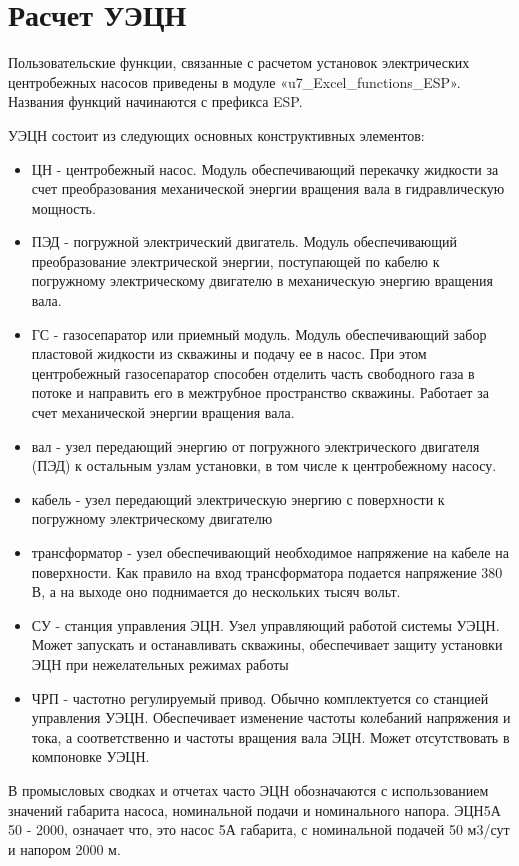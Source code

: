 \section{Расчет УЭЦН}
Пользовательские функции, связанные с расчетом установок электрических центробежных насосов приведены в модуле «u7\_Excel\_functions\_ESP».  Названия функций начинаются с префикса ESP. 

УЭЦН состоит из следующих основных конструктивных элементов:
\begin{itemize}
	\item ЦН - центробежный насос. Модуль обеспечивающий перекачку жидкости за счет преобразования механической энергии вращения вала в гидравлическую мощность. 
	\item ПЭД - погружной электрический двигатель. Модуль обеспечивающий преобразование электрической энергии, поступающей по кабелю к погружному электрическому двигателю в механическую энергию вращения вала.
	\item ГС - газосепаратор или приемный модуль. Модуль обеспечивающий забор пластовой жидкости из скважины и подачу ее в насос. При этом центробежный газосепаратор способен отделить часть свободного газа в потоке и направить его в межтрубное пространство скважины. Работает за счет механической энергии вращения вала.
	\item вал - узел передающий энергию от погружного электрического двигателя (ПЭД) к остальным узлам установки, в том числе к центробежному насосу.
	\item кабель - узел передающий электрическую энергию с поверхности к погружному электрическому двигателю
	\item трансформатор - узел обеспечивающий необходимое напряжение на кабеле на поверхности. Как правило на вход трансформатора подается напряжение 380 В, а на выходе оно поднимается до нескольких тысяч вольт. 
	\item СУ - станция управления ЭЦН. Узел управляющий работой системы УЭЦН. Может запускать и  останавливать скважины, обеспечивает защиту установки ЭЦН при нежелательных режимах работы
	\item ЧРП - частотно регулируемый привод. Обычно комплектуется со станцией управления УЭЦН. Обеспечивает изменение частоты колебаний напряжения и тока, а соответственно и частоты вращения вала ЭЦН. Может отсутствовать в компоновке УЭЦН. 
\end{itemize}

В промысловых сводках и отчетах часто ЭЦН обозначаются с использованием значений габарита насоса, номинальной подачи и номинального напора. ЭЦН5А 50 - 2000, означает что, это насос 5А габарита, с номинальной подачей 50 м3/сут и напором 2000 м. 

